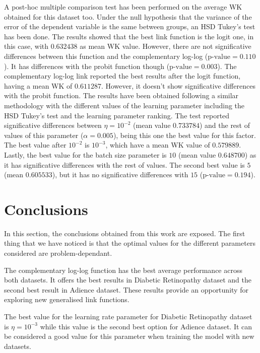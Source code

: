 \documentclass[10pt, a4paper, titlepage, twocolumn]{article}
\begin{document}
	A post-hoc multiple comparison test has been performed on the average WK obtained for this dataset too. Under the null hypothesis that the variance of the error of the dependent variable is the same between groups, an HSD Tukey's test has been done. The results showed that the best link function is the logit one, in this case, with $0.632438$ as mean WK value. However, there are not significative differences between this function and the complementary log-log ($\text{p-value}=0.110$). It has differences with the probit function though ($\text{p-value} = 0.003$). The complementary log-log link reported the best results after the logit function, having a mean WK of $0.611287$. However, it doesn't show significative differences with the probit function.
	The results have been obtained following a similar methodology with the different values of the learning parameter including the HSD Tukey's test and the learning parameter ranking. The test reported significative differences between $\eta=10^{-2}$ (mean value $0.733784$) and the rest of values of this parameter ($\alpha=0.005$), being this one the best value for this factor. The best value after $10^{-2}$ is $10^{-3}$, which have a mean WK value of $0.579889$. Lastly, the best value for the batch size parameter is $10$ (mean value $0.648700$) as it has significative differences with the rest of values. The second best value is $5$ (mean $0.605533$), but it has no significative differences with $15$ ($\text{p-value}= 0.194$).
	
	\section{Conclusions}
	\label{sect:conclusions}
	In this section, the conclusions obtained from this work are exposed. The first thing that we have noticed is that the optimal values for the different parameters considered are problem-dependant. 
	
	The complementary log-log function has the best average performance across both datasets. It offers the best results in Diabetic Retinopathy dataset and the second best result in Adience dataset. These results provide an opportunity for exploring new generalised link functions.
	
	The best value for the learning rate parameter for  Diabetic Retinopathy dataset is $\eta = 10^{-3}$ while this value is the second best option for Adience dataset. It can be considered a good value for this parameter when training the model with new datasets.
	
\end{document}
